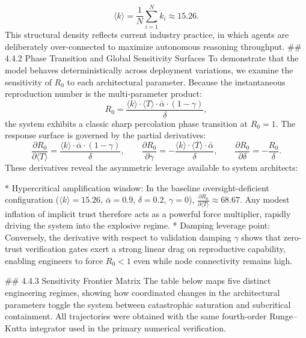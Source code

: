 $$\langle k \rangle = \frac{1}{N}\sum_{i=1}^{N} k_i \approx 15.26.$$ 
This structural density reflects current industry practice, in which agents are deliberately over-connected to maximize autonomous reasoning throughput.
## 4.4.2 Phase Transition and Global Sensitivity Surfaces
To demonstrate that the model behaves deterministically across deployment variations, we examine the sensitivity of $R_0$ to each architectural parameter. Because the instantaneous reproduction number is the multi-parameter product:
$$R_0 = \frac{\langle k \rangle \cdot \langle T \rangle \cdot \bar{\alpha} \cdot (1 - \gamma)}{\delta},$$ 
the system exhibits a classic sharp percolation phase transition at $R_0 = 1$. The response surface is governed by the partial derivatives:
$$\frac{\partial R_0}{\partial \langle T \rangle} = \frac{\langle k \rangle \cdot \bar{\alpha} \cdot (1 - \gamma)}{\delta}, \qquad \frac{\partial R_0}{\partial \gamma} = -\frac{\langle k \rangle \cdot \langle T \rangle \cdot \bar{\alpha}}{\delta}, \qquad \frac{\partial R_0}{\partial \delta} = -\frac{R_0}{\delta}.$$ 
These derivatives reveal the asymmetric leverage available to system architects:

* Hypercritical amplification window: In the baseline oversight-deficient configuration ($\langle k \rangle = 15.26$, $\bar{\alpha}=0.9$, $\delta=0.2$, $\gamma=0$), $\frac{\partial R_0}{\partial \langle T \rangle} \approx 68.67$. Any modest inflation of implicit trust therefore acts as a powerful force multiplier, rapidly driving the system into the explosive regime.
* Damping leverage point: Conversely, the derivative with respect to validation damping $\gamma$ shows that zero-trust verification gates exert a strong linear drag on reproductive capability, enabling engineers to force $R_0 < 1$ even while node connectivity remains high.

## 4.4.3 Sensitivity Frontier Matrix
The table below maps five distinct engineering regimes, showing how coordinated changes in the architectural parameters toggle the system between catastrophic saturation and subcritical containment. All trajectories were obtained with the same fourth-order Runge–Kutta integrator used in the primary numerical verification.

